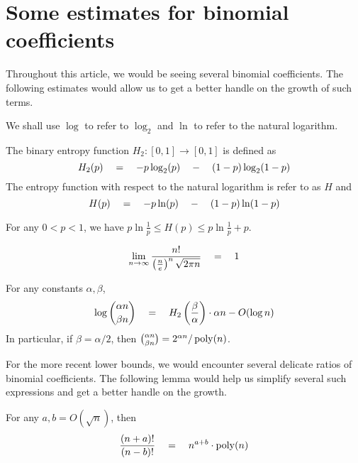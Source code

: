 \chapter{Some estimates for binomial coefficients}\label{chap:binom-estimates}

Throughout this article, we would be seeing several binomial coefficients.  
The following estimates would allow us to get a better handle on the growth of such terms. 

We shall use $\log$ to refer to $\log_2$ and $\ln$ to refer to the natural logarithm. 


\begin{definition}\label{def:entropy}
The binary entropy function $H_2:[0,1]\rightarrow [0,1]$ is defined as
\[
H_2(p) \quad = \quad - p \log_2(p) \quad - \quad (1-p) \log_2(1-p)
\]
The entropy function with respect to the natural logarithm is refer to as $H$ and
\[
H(p) \quad = \quad - p \ln(p) \quad - \quad (1-p) \ln(1-p)
\]
\end{definition}

\begin{proposition}\label{prop:entropy-estimate}
For any $0< p  < 1$, we have $p\ln\frac{1}{p} \leq H(p) \leq p\ln\frac{1}{p} + p$. 
\end{proposition}

\begin{proposition}\label{prop:sterling}
\[
\lim_{n\rightarrow \infty}\frac{n!}{\left(\frac{n}{e}\right)^n \sqrt{2\pi n}}  \quad=\quad 1
\]
\end{proposition}

\begin{proposition}
For any constants $\alpha, \beta$, 
\[
\log\binom{\alpha n}{\beta n} \quad = \quad H_2\left(\frac{\beta}{\alpha}\right) \cdot \alpha n - O(\log n)
\]
In particular, if $\beta = \alpha/2$, then $\binom{\alpha n}{\beta{n}} = 2^{\alpha n} / \operatorname{poly}(n)$. 
\end{proposition}

For the more recent lower bounds, we would encounter several delicate ratios of binomial coefficients. 
The following lemma would help us simplify several such expressions and get a better handle on the growth. 

\begin{lemma}{\cite[Lemma 6]{gkks13}}\label{lem:factorial-ratio} For any $a,b = O(\sqrt{n})$, then
\[
\frac{(n+a)!}{(n-b)!}\quad=\quad n^{a + b} \cdot \operatorname{poly}(n)
\]
\end{lemma}

